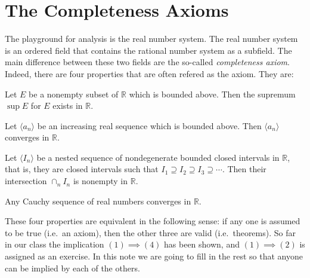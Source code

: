 \section{The Completeness Axioms}
\label{sec:complete-axioms}

The playground for analysis is the real number system.
The real number system is an ordered field that contains the rational number system as a subfield.
The main difference between these two fields are the so-called {\em completeness axiom}.
Indeed, there are four properties that are often refered as the axiom.  They are:

\begin{property}
  Let $E$ be a nonempty subset of $\mathbb{R}$ which is bounded above.
  Then the supremum $\sup E$ for $E$ exists in $\mathbb{R}$.
\end{property}

\begin{property}
  Let $\langle a_n \rangle$ be an increasing real sequence which is bounded above.
  Then $\langle a_n \rangle$ converges in $\mathbb{R}$.
\end{property}

\begin{property}
  Let $\langle I_n \rangle$ be a nested sequence of nondegenerate bounded closed intervals in $\mathbb{R}$, that is, they are closed intervals such that $I_1 \supseteq I_2 \supseteq I_3 \supseteq \cdots$.  Then their intersection $\cap_n I_n$ is nonempty in $\mathbb{R}$.
\end{property}

\begin{property}
  Any Cauchy sequence of real numbers converges in $\mathbb{R}$.
\end{property}

These four properties are equivalent in the following sense: if any one is assumed to be true (i.e.\ an axiom), then the other three are valid (i.e.\ theorems).
So far in our class the implication $(1) \implies (4)$ has been shown, and $(1) \implies (2)$ is assigned as an exercise.
In this note we are going to fill in the rest so that anyone can be implied by each of the others.

